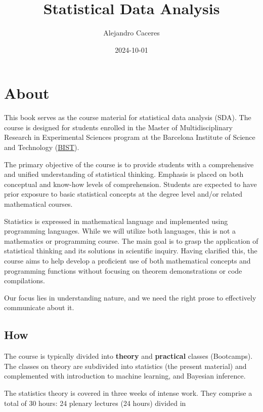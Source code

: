 \documentclass[
]{book}
\title{Statistical Data Analysis}
\author{Alejandro Caceres}
\date{2024-10-01}
\begin{document}
\maketitle

{
\setcounter{tocdepth}{1}
\tableofcontents
}
\hypertarget{about}{%
\chapter{About}\label{about}}

This book serves as the course material for statistical data analysis (SDA). The course is designed for students enrolled in the Master of Multidisciplinary Research in Experimental Sciences program at the Barcelona Institute of Science and Technology (\href{https://bist.eu/}{BIST}).

The primary objective of the course is to provide students with a comprehensive and unified understanding of statistical thinking. Emphasis is placed on both conceptual and know-how levels of comprehension. Students are expected to have prior exposure to basic statistical concepts at the degree level and/or related mathematical courses.

Statistics is expressed in mathematical language and implemented using programming languages. While we will utilize both languages, this is not a mathematics or programming course. The main goal is to grasp the application of statistical thinking and its solutions in scientific inquiry. Having clarified this, the course aims to help develop a proficient use of both mathematical concepts and programming functions without focusing on theorem demonstrations or code compilations.

Our focus lies in understanding nature, and we need the right prose to effectively communicate about it.

\hypertarget{how}{%
\section{How}\label{how}}

The course is typically divided into \textbf{theory} and \textbf{practical} classes (Bootcamps). The classes on theory are subdivided into statistics (the present material) and complemented with introduction to machine learning, and Bayesian inference.

The statistics theory is covered in three weeks of intense work. They comprise a total of 30 hours: 24 plenary lectures (24 hours) divided in
\end{document}
